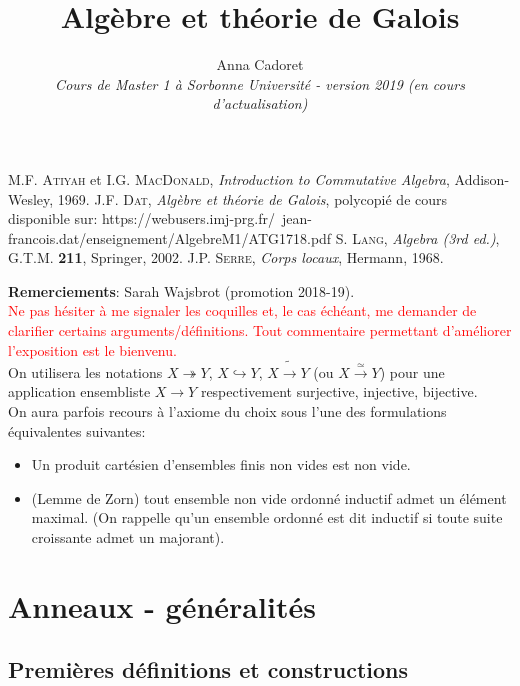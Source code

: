 \documentclass[a4paper, oneside, 12pt]{book}
\title{Algèbre et théorie de Galois}
\author{Anna Cadoret\\
\textit{Cours de Master 1 à Sorbonne Université - version 2019 (en cours d'actualisation)}}
\theoremstyle{theoremeStyle} %
\theoremstyle{definition} %
\begin{document}
\maketitle
\tableofcontents

\begin{thebibliography}{99}
 M.F. \textsc{Atiyah} et I.G. \textsc{MacDonald},
  {\it Introduction to Commutative Algebra}, Addison-Wesley,  1969.
 J.F. \textsc{Dat}, {\it Algèbre et théorie de Galois}, polycopié de cours disponible sur: https://webusers.imj-prg.fr/~jean-francois.dat/enseignement/AlgebreM1/ATG1718.pdf
 S. \textsc{Lang},
  {\it Algebra (3rd ed.)}, G.T.M. \textbf{211}, Springer, 2002.
 J.P. \textsc{Serre},
  {\it Corps locaux}, Hermann, 1968.
\end{thebibliography}

 \textbf{Remerciements}: Sarah Wajsbrot (promotion 2018-19).\\

\textcolor{red}{Ne pas hésiter à me signaler les coquilles et, le cas échéant, me demander de clarifier  certains arguments/définitions. Tout  commentaire permettant d'améliorer l'exposition est le bienvenu.}\\

 On utilisera les notations $X\twoheadrightarrow Y$, $X\hookrightarrow Y$, $X\tilde{\rightarrow} Y$ (ou $X\stackrel{\simeq}{\rightarrow} Y$) pour une application ensembliste $X\rightarrow Y$ respectivement  surjective, injective, bijective.\\


  On aura parfois recours à l'axiome du choix sous l'une des formulations équivalentes suivantes:
 \begin{itemize}
 \item Un produit cartésien d'ensembles finis non vides est non vide.
 \item (Lemme de Zorn) tout ensemble non vide ordonné inductif admet un élément maximal. (On rappelle qu'un ensemble ordonné est dit inductif si toute suite croissante admet un majorant).
 \end{itemize}
\part{Anneaux - généralités}

\chapter{Premières définitions et constructions}
\end{document}
